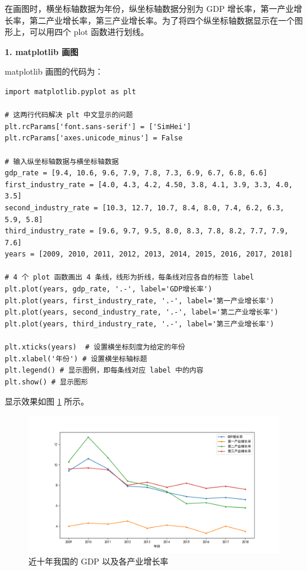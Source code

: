 在画图时，横坐标轴数据为年份，纵坐标轴数据分别为 GDP 增长率，第一产业增长率，第二产业增长率，第三产业增长率。为了将四个纵坐标轴数据显示在一个图形上，可以用四个 plot 函数进行划线。

\vspace{3pt}
\noindent\textbf{1. matplotlib 画图}
\vspace{3pt}

matplotlib 画图的代码为：

\begin{lstlisting}[Language = Python]
import matplotlib.pyplot as plt

# 这两行代码解决 plt 中文显示的问题
plt.rcParams['font.sans-serif'] = ['SimHei']
plt.rcParams['axes.unicode_minus'] = False

# 输入纵坐标轴数据与横坐标轴数据
gdp_rate = [9.4, 10.6, 9.6, 7.9, 7.8, 7.3, 6.9, 6.7, 6.8, 6.6]
first_industry_rate = [4.0, 4.3, 4.2, 4.50, 3.8, 4.1, 3.9, 3.3, 4.0, 3.5]
second_industry_rate = [10.3, 12.7, 10.7, 8.4, 8.0, 7.4, 6.2, 6.3, 5.9, 5.8]
third_industry_rate = [9.6, 9.7, 9.5, 8.0, 8.3, 7.8, 8.2, 7.7, 7.9, 7.6]
years = [2009, 2010, 2011, 2012, 2013, 2014, 2015, 2016, 2017, 2018]

# 4 个 plot 函数画出 4 条线，线形为折线，每条线对应各自的标签 label
plt.plot(years, gdp_rate, '.-', label='GDP增长率')
plt.plot(years, first_industry_rate, '.-', label='第一产业增长率')
plt.plot(years, second_industry_rate, '.-', label='第二产业增长率')
plt.plot(years, third_industry_rate, '.-', label='第三产业增长率')

plt.xticks(years)  # 设置横坐标刻度为给定的年份
plt.xlabel('年份') # 设置横坐标轴标题
plt.legend() # 显示图例，即每条线对应 label 中的内容
plt.show() # 显示图形
\end{lstlisting}

显示效果如图 \ref{fig:gdp} 所示。

\begin{figure}[!ht]
\centering
  \includegraphics[width=\textwidth]{figure/gdp.png}
  \caption{近十年我国的 GDP 以及各产业增长率}\label{fig:gdp}
\end{figure}

